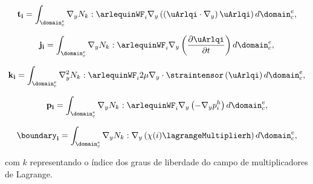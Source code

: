 \begin{align}
	\mathbf{t_{i}} = \int_{\domain_{c}^{e}} \nabla_y N_{k} : \arlequinWF_{i} \nabla_y \left( \left( \uArlqi \cdot  \nabla_y \right) \uArlqi \right)  d\domain_{c}^{e},
\end{align}

\begin{align}
	\mathbf{j_{i}} = \int_{\domain_{c}^{e}} \nabla_y N_{k} :  \arlequinWF_{i} \nabla_y \left(\frac{\partial\uArlqi}{\partial t}  \right)  d\domain_{c}^{e},
\end{align}

\begin{align}
	\mathbf{k_{i}} = \int_{\domain_{c}^{e}} \nabla_y^{2} N_{k} : \arlequinWF_{i} 2 \mu \nabla_y \cdot \straintensor \left(\uArlqi\right)    d\domain_{c}^{e},
\end{align}

\begin{align}
	\mathbf{p_{i}} = \int_{\domain_{c}^{e}} \nabla_y N_{k} : \arlequinWF_{i} \nabla_y \left(-\nabla_y p_i^h\right)    d\domain_{c}^{e},
\end{align}

\begin{align}
	\mathbf{\boundary_{i}} = \int_{\domain_{c}^{e}} \nabla_y N_{k} : \nabla_y \left(\chi (i) \lagrangeMultiplierh\right)    d\domain_{c}^{e},
\end{align}


\noindent com $k$ representando o índice dos graus de liberdade do campo de multiplicadores de Lagrange.